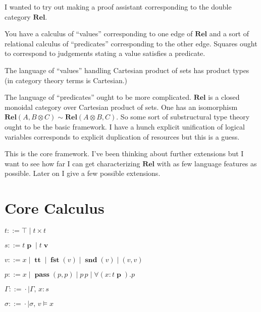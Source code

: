 \documentclass[twocolumn]{scrartcl}
\newcommand{\Rel}{\textbf{Rel}}
\newcommand{\bnfdef}{\mathbin{::=}}
\DeclareMathOperator{\val}{\textbf{v}}
\DeclareMathOperator{\prd}{\textbf{p}}
\DeclareMathOperator{\coin}{\textbf{tt}}
\DeclareMathOperator{\fst}{\textbf{fst}}
\DeclareMathOperator{\snd}{\textbf{snd}}
\DeclareMathOperator{\pass}{\textbf{pass}}
\begin{document}
I wanted to try out making a proof assistant corresponding to the
double category \(\Rel\).

You have a calculus of ``values'' corresponding to one edge of
\(\Rel\) and a sort of relational calculus of ``predicates''
corresponding to the other edge. Squares ought to correspond to
judgements stating a value satisfies a predicate.

The language of ``values'' handling Cartesian product of sets has
product types (in category theory terms is Cartesian.)

The language of ``predicates'' ought to be more complicated. \(\Rel\)
is a closed monoidal category over Cartesian product of sets.  One has
an isomorphism \( \Rel(A, B \otimes C) \sim \Rel (A \otimes B, C) \).
So some sort of substructural type theory ought to be the basic
framework.  I have a hunch explicit unification of logical variables
corresponds to explicit duplication of resources but this is a guess.

This is the core framework.  I've been thinking about further
extensions but I want to see how far I can get characterizing
\(\Rel\) with as few language features as possible.  Later on I
give a few possible extensions.



\begin{center}
\end{center}

\section*{Core Calculus}

\begin{description}[nosep]
\item[Types] \hfill \( t \bnfdef \top \mid t \times t \)
\item[Sorts] \hfill \( s \bnfdef t \prd \mid t \val \)
\item[Values] \hfill \( v \bnfdef x \mid \coin \mid \fst(v) \mid \snd(v) \mid ( v , v ) \)
\item[Predicates] \hfill \( p \bnfdef x \mid \pass(p, p) \mid p \, p \mid \forall (x \colon t \prd) . p \)
\item[Environment] \hfill \( \Gamma \bnfdef \cdot \mid \Gamma , \, x \colon s  \)
\item[Substitutions] \hfill \( \sigma \bnfdef \cdot \mid \sigma , \, v \models x  \)
\end{description}
\end{document}
